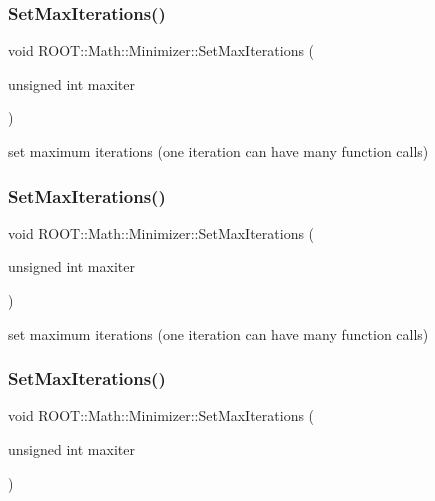 \subsubsection{\texorpdfstring{SetMaxIterations()}{SetMaxIterations()}\hspace{0.1cm}{\footnotesize\ttfamily [1/3]}}
{\footnotesize\ttfamily void R\+O\+O\+T\+::\+Math\+::\+Minimizer\+::\+Set\+Max\+Iterations (\begin{DoxyParamCaption}\item[{unsigned int}]{maxiter }\end{DoxyParamCaption})\hspace{0.3cm}{\ttfamily [inline]}}



set maximum iterations (one iteration can have many function calls) 

\mbox{\label{classROOT_1_1Math_1_1Minimizer_a1aa272e578cdf2af1b80cc641ce6c58c}} 
\subsubsection{\texorpdfstring{SetMaxIterations()}{SetMaxIterations()}\hspace{0.1cm}{\footnotesize\ttfamily [2/3]}}
{\footnotesize\ttfamily void R\+O\+O\+T\+::\+Math\+::\+Minimizer\+::\+Set\+Max\+Iterations (\begin{DoxyParamCaption}\item[{unsigned int}]{maxiter }\end{DoxyParamCaption})\hspace{0.3cm}{\ttfamily [inline]}}



set maximum iterations (one iteration can have many function calls) 

\mbox{\label{classROOT_1_1Math_1_1Minimizer_a1aa272e578cdf2af1b80cc641ce6c58c}} 
\subsubsection{\texorpdfstring{SetMaxIterations()}{SetMaxIterations()}\hspace{0.1cm}{\footnotesize\ttfamily [3/3]}}
{\footnotesize\ttfamily void R\+O\+O\+T\+::\+Math\+::\+Minimizer\+::\+Set\+Max\+Iterations (\begin{DoxyParamCaption}\item[{unsigned int}]{maxiter }\end{DoxyParamCaption})\hspace{0.3cm}{\ttfamily [inline]}}




